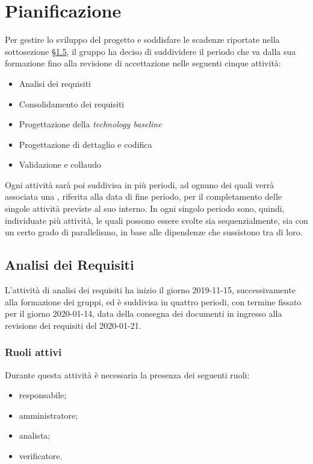 \section{Pianificazione}

	Per gestire lo sviluppo del progetto e soddisfare le scadenze riportate nella sottosezione \hyperref[riferimento_scadenze]{\S1.5}, il gruppo ha deciso di suddividere il periodo che va dalla sua formazione fino alla revisione di accettazione nelle seguenti cinque attività:
	\begin{itemize}
		\item Analisi dei requisiti
		\item Consolidamento dei requisiti
		\item Progettazione della \textit{technology baseline}
		\item Progettazione di dettaglio e codifica
		\item Validazione e collaudo
	\end{itemize}
	Ogni attività sarà poi suddivisa in più periodi, ad ognuno dei quali verrà associata una , riferita alla data di fine periodo, per il completamento delle singole attività previste al suo interno. In ogni singolo periodo sono, quindi, individuate più attività, le quali possono essere svolte sia sequenzialmente, sia con un certo grado di parallelismo, in base alle dipendenze che sussistono tra di loro.
	
	\subsection{Analisi dei Requisiti}
	
		L'attività di analisi dei requisiti ha inizio il giorno 2019-11-15, successivamente alla formazione dei gruppi, ed è suddivisa in quattro periodi, con termine fissato per il giorno 2020-01-14, data della consegna dei documenti in ingresso alla revisione dei requisiti del 2020-01-21.
		
		\subsubsection{Ruoli attivi}
		
			Durante questa attività è necessaria la presenza dei seguenti ruoli:
			\begin{itemize}
				\item responsabile;
				\item amministratore;
				\item analista;
				\item verificatore.
			\end{itemize}
		
